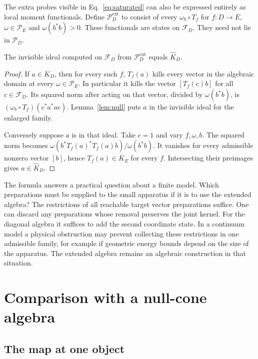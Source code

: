 \documentclass[11pt,letterpaper]{article}
\newcommand{\F}{\mathcal F}
\newcommand{\Probes}{\mathcal P}
\newcommand{\sat}{\widehat K}
\begin{document}
The extra probes visible in Eq.~\eqref{eq:saturated} can also be expressed entirely as local moment functionals. Define $\Probes^{\mathrm{ext}}_D$ to consist of every $\omega_b\circ T_f$ for $f:D\to E$, $\omega\in\Probes_E$ and $\omega(b^*b)>0$. These functionals are states on $\F_D$. They need not lie in $\Probes_D$.

\begin{proposition}\label{prop:extstates}
The invisible ideal computed on $\F_D$ from $\Probes^{\mathrm{ext}}_D$ equals $\sat_D$.
\end{proposition}
\begin{proof}
If $a\in\sat_D$, then for every such $f$, $T_f(a)$ kills every vector in the algebraic domain at every $\omega\in\Probes_E$. In particular it kills the vector $[T_f(c)b]$ for all $c\in\F_D$. Its squared norm after acting on that vector, divided by $\omega(b^*b)$, is $(\omega_b\circ T_f)(c^*a^*ac)$. Lemma~\ref{lem:null} puts $a$ in the invisible ideal for the enlarged family.

Conversely suppose $a$ is in that ideal. Take $c=1$ and vary $f,\omega,b$. The squared norm becomes $\omega(b^*T_f(a)^*T_f(a)b)/\omega(b^*b)$. It vanishes for every admissible nonzero vector $[b]$, hence $T_f(a)\in K_E$ for every $f$. Intersecting their preimages gives $a\in\sat_D$.
\end{proof}

The formula answers a practical question about a finite model. Which preparations must be supplied to the small apparatus if it is to use the extended algebra? The restrictions of all reachable target vector preparations suffice. One can discard any preparations whose removal preserves the joint kernel. For the diagonal algebra it suffices to add the second coordinate state. In a continuum model a physical obstruction may prevent collecting these restrictions in one admissible family, for example if geometric energy bounds depend on the size of the apparatus. The extended algebra remains an algebraic construction in that situation.

\section{Comparison with a null-cone algebra}
\label{sec:comparison}

\subsection{The map at one object}
\end{document}
